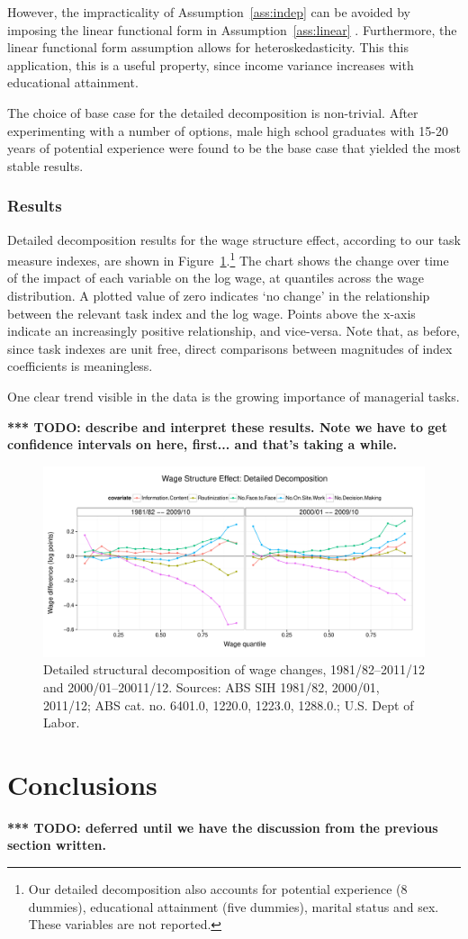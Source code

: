 However, the impracticality of Assumption~\ref{ass:indep} can be avoided by imposing the linear functional form in Assumption~\ref{ass:linear} \citep[p.28]{Fortin2011}. Furthermore, the linear functional form assumption allows for heteroskedasticity. This this application, this is a useful property, since income variance increases with educational attainment.

The choice of base case for the detailed decomposition is non-trivial. After experimenting with a number of options, male high school graduates with 15-20 years of potential experience were found to be the base case that yielded the most stable results.

\subsubsection{Results}

Detailed decomposition results for the wage structure effect, according to our task measure indexes, are shown in Figure~\ref{fig:structure}.\footnote{Our detailed decomposition also accounts for potential experience (8 dummies), educational attainment (five dummies), marital status and sex. These variables are not reported.} The chart shows the change over time of the impact of each variable on the log wage, at quantiles across the wage distribution. A plotted value of zero indicates `no change' in the relationship between the relevant task index and the log wage. Points above the x-axis indicate an increasingly positive relationship, and vice-versa. Note that, as before, since task indexes are unit free, direct comparisons between magnitudes of index coefficients is meaningless.

One clear trend visible in the data is the growing importance of managerial tasks.

{\bf \color{red} *** TODO: describe and interpret these results. Note we have to get confidence intervals on here, first... and that's taking a while.}

\begin{figure}
  \centering
  \includegraphics[width=\textwidth]{../figure/structure_decomp.pdf}
  \caption{Detailed structural decomposition of wage changes, 1981/82--2011/12 and 2000/01--20011/12. Sources: ABS SIH 1981/82, 2000/01, 2011/12; ABS cat. no. 6401.0, 1220.0, 1223.0, 1288.0.; U.S. Dept of Labor.}
  \label{fig:structure}
\end{figure}

\section{Conclusions}

{\bf \color{red} *** TODO: deferred until we have the discussion from the previous section written.}

